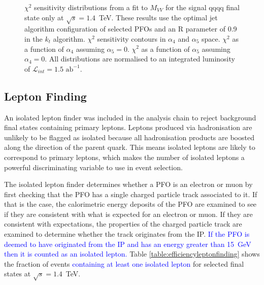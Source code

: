 \begin{figure}[h!]
\caption[$\chi^{2}$ sensitivity distributions from a fit to the invariant mass of the visible system, $M_{VV}$, for the signal {\nu}{\nu}qqqq final state only at $\sqrt{s}=1.4$~TeV.  These results use the optimal jet algorithm configuration of selected PFOs and an R parameter of 0.9 in the $k_{t}$ algorithm.  \protect{} $\chi^{2}$ sensitivity contours in $\alpha_{4}$ and $\alpha_{5}$ space.  \protect{} $\chi^{2}$ as a function of $\alpha_{4}$ assuming $\alpha_{5} = 0$.  \protect{} $\chi^{2}$ as a function of $\alpha_{5}$ assuming $\alpha_{4} = 0$.  All distributions are normalised to an integrated luminosity of $\mathcal{L}_{int} = 1.5\text{ ab}^{-1}$.]{$\chi^{2}$ sensitivity distributions from a fit to $M_{VV}$ for the signal {\nu}{\nu}qqqq final state only at $\sqrt{s}=1.4$~TeV.  These results use the optimal jet algorithm configuration of selected PFOs and an R parameter of 0.9 in the $k_{t}$ algorithm.  \protect{} $\chi^{2}$ sensitivity contours in $\alpha_{4}$ and $\alpha_{5}$ space.  \protect{} $\chi^{2}$ as a function of $\alpha_{4}$ assuming $\alpha_{5} = 0$.  \protect{} $\chi^{2}$ as a function of $\alpha_{5}$ assuming $\alpha_{4} = 0$.  All distributions are normalised to an integrated luminosity of $\mathcal{L}_{int} = 1.5\text{ ab}^{-1}$.}
\label{fig:allchi2jetalgoideal1400GeV}
\end{figure}


\subsection{Lepton Finding} 
\label{sec:isolatedleptonfinding}
An isolated lepton finder \cite{Wendt:2007iw} was included in the analysis chain to reject background final states containing primary leptons.  Leptons produced via hadronisation are unlikely to be flagged as isolated because all hadronisation products are boosted along the direction of the parent quark.  This means isolated leptons are likely to correspond to primary leptons, which makes the number of isolated leptons a powerful discriminating variable to use in event selection.  

The isolated lepton finder determines whether a PFO is an electron or muon by first checking that the PFO has a single charged particle track associated to it.  If that is the case, the calorimetric energy deposits of the PFO are examined to see if they are consistent with what is expected for an electron or muon.  If they are consistent with expectations, the properties of the charged particle track are examined to determine whether the track originates from the IP.  \textcolor{blue}{If the PFO is deemed to have originated from the IP and has an energy greater than 15~GeV then it is counted as an isolated lepton.}  Table \ref{table:efficiencyleptonfinding} shows the fraction of events \textcolor{blue}{containing at least one isolated lepton} for selected final states at $\sqrt{s}=1.4$~TeV.  

